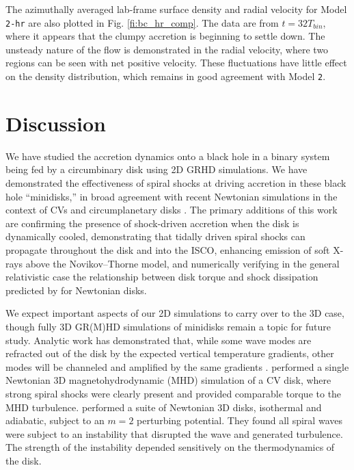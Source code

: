 \documentclass{emulateapj}
\newcommand{\model}[1]{{Model \texttt{#1}}}
\begin{document}
The azimuthally averaged lab-frame surface density and radial velocity for \model{2-hr} are also plotted in Fig. \ref{fi:bc_hr_comp}.  The data are from $t = 32T_{bin}$, where it appears that the clumpy accretion is beginning to settle down.  The unsteady nature of the flow is demonstrated in the radial velocity, where two regions can be seen with net positive velocity.  These fluctuations have little effect on the density distribution, which remains in good agreement with \model{2}.



\section{Discussion}
\label{sec:discussion}

We have studied the accretion dynamics onto a black hole in a binary system being fed by a circumbinary disk using 2D GRHD simulations. We have demonstrated the effectiveness of spiral shocks at driving accretion in these black hole ``minidisks,'' in broad agreement with recent Newtonian simulations in the context of CVs \citep{Ju16}  and circumplanetary disks \citep{Zhu16}.  The primary additions of this work are confirming the presence of shock-driven accretion when the disk is dynamically cooled, demonstrating that tidally driven spiral shocks can propagate throughout the disk and into the ISCO, enhancing emission of soft X-rays above the Novikov--Thorne model, and numerically verifying in the general relativistic case the relationship between disk torque and shock dissipation predicted by \cite{Rafikov16} for Newtonian disks.

We expect important aspects of our 2D simulations to carry over to the 3D case, though fully 3D GR(M)HD simulations of minidisks remain a topic for future study.  Analytic work has demonstrated that, while some wave modes are refracted out of the disk by the expected vertical temperature gradients, other modes will be channeled and amplified by the same gradients \citep{Lubow98}. \cite{Ju16} performed a single Newtonian 3D magnetohydrodynamic (MHD) simulation of a CV disk, where strong spiral shocks were clearly present and provided comparable torque to the MHD turbulence.  \cite{Bae16} performed a suite of Newtonian 3D disks, isothermal and adiabatic, subject to an $m=2$ perturbing potential.  They found all spiral waves were subject to an instability that disrupted the wave and generated turbulence.  The strength of the instability depended sensitively on the thermodynamics of the disk.
\end{document}
